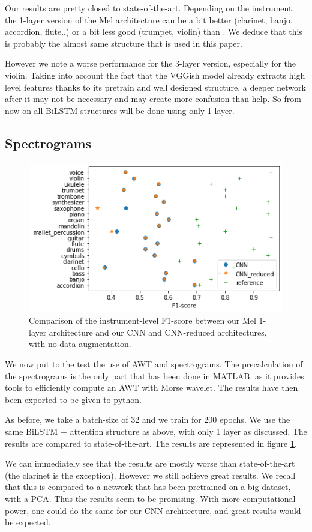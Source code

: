 \documentclass[final]{cvpr}
\begin{document}
Our results are pretty closed to state-of-the-art. Depending on the instrument, the 1-layer version of the Mel architecture can be a bit better (clarinet, banjo, accordion, flute..) or a bit less good (trumpet, violin) than \cite{squelette_progr}. We deduce that this is probably the almost same structure that is used in this paper.

However we note a worse performance for the 3-layer version, especially for the violin. Taking into account the fact that the VGGish model already extracts high level features thanks to its pretrain and well designed structure, a deeper network after it may not be necessary and may create more confusion than help. So from now on all BiLSTM structures will be done using only 1 layer.
\subsection{Spectrograms}
\begin{figure}
	\centering
	\includegraphics[scale = 0.5]{cnn_plot.png}
	\caption{Comparison of the instrument-level F1-score between our Mel 1-layer architecture and our CNN and CNN-reduced architectures, with no data augmentation.}
	\label{cnn_plot}
\end{figure}
We now put to the test the use of AWT and spectrograms. The precalculation of the spectrograms is the only part that has been done in MATLAB, as it provides tools to efficiently compute an AWT with Morse wavelet. The results have then been exported to be given to python.

As before, we take a batch-size of 32 and we train for 200 epochs. We use the same BiLSTM + attention structure as above, with only 1 layer as discussed. The results are compared to state-of-the-art. The results are represented in figure \ref{cnn_plot}.

We can immediately see that the results are mostly worse than state-of-the-art (the clarinet is the exception). However we still achieve great results. We recall that this is compared to a network that has been pretrained on a big dataset, with a PCA. Thus the results seem to be promising. With more computational power, one could do the same for our CNN architecture, and great results would be expected.
\end{document}
